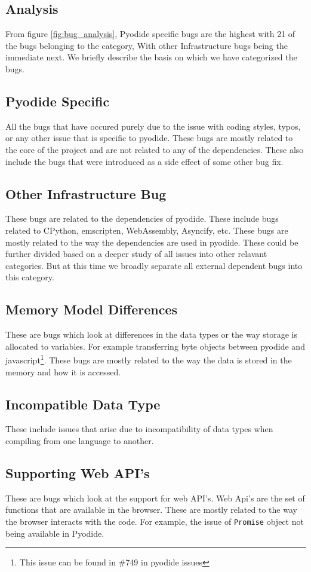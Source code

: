 \subsection{Analysis}
From figure \ref{fig:bug_analysis}, Pyodide specific bugs are the highest with 21 of the bugs belonging to the category, With other Infrastructure bugs being the immediate next. We briefly describe the basis on which we have categorized the bugs.
\subsection*{Pyodide Specific}
All the bugs that have occured purely due to the issue with coding styles, typos, or any other issue that is specific to pyodide. These bugs are mostly related to the core of the project and are not related to any of the dependencies. These also include the bugs that were introduced as a side effect of some other bug fix.
\subsection*{Other Infrastructure Bug}
These bugs are related to the dependencies of pyodide. These include bugs related to CPython, emscripten, WebAssembly, Asyncify, etc. These bugs are mostly related to the way the dependencies are used in pyodide. These could be further divided based on a deeper study of all issues into other relavant categories. But at this time we broadly separate all external dependent bugs into this category.
\subsection*{Memory Model Differences}
These are bugs which look at differences in the data types or the way storage is allocated to variables. For example transferring byte objects between pyodide and javascript\footnote{This issue can be found in $\#$749 in pyodide issues\cite{pyodide-issues}}. These bugs are mostly related to the way the data is stored in the memory and how it is accessed.
\subsection*{Incompatible Data Type}
These include issues that arise due to incompatibility of data types when compiling from one language to another. 
\subsection*{Supporting Web API's}
These are bugs which look at the support for web API's. Web Api's are the set of functions that are available in the browser. These are mostly related to the way the browser interacts with the code. For example, the issue of \texttt{Promise} object not being available in Pyodide.
